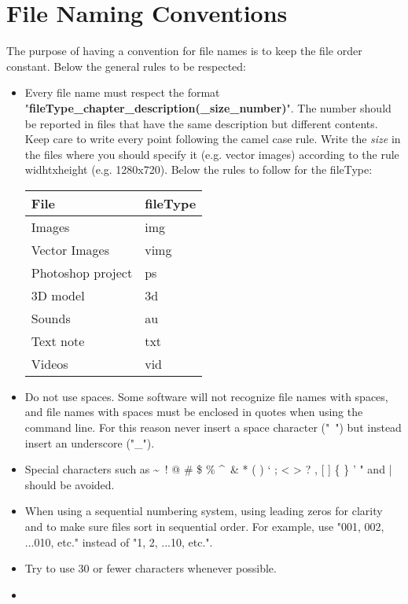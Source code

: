 \section{File Naming Conventions}
The purpose of having a convention for file names is to keep the file order constant. Below the general rules to be respected:
\begin{itemize}
	\item Every file name must respect the format "\textbf{fileType\_chapter\_description(\_size\_number)}". The number should be reported in files that have the same description but different contents. Keep care to write every point following the camel case rule. Write the \textit{size} in the files where you should specify it (e.g. vector images) according to the rule widhtxheight (e.g. 1280x720). Below the rules to follow for the fileType:
	
	\begin{center}
		\begin{tabular}[c]{| p{4cm} | p{4cm} |}
			\hline
			\textbf{File} & \textbf{fileType}\\
			\hline
			Images & img\\
			\hline
			Vector Images & vimg\\
			\hline
			Photoshop project & ps \\
			\hline
			3D model & 3d\\
			\hline
			Sounds & au\\
			\hline
			Text note & txt\\
			\hline
			Videos & vid\\
			\hline
		\end{tabular}
	\end{center}
	
	\item Do not use spaces. Some software will not recognize file names with spaces, and file names with spaces must be enclosed in quotes when using the command line. For this reason never insert a space character ("\ ") but instead insert an underscore ("\_").
	\item Special characters such as \textasciitilde\ ! @ \# \$ \% \textasciicircum\ \& * ( ) ` ; < > ? , [ ] \{ \} ' " and | should be avoided.
	\item When using a sequential numbering system, using leading zeros for clarity and to make sure files sort in sequential order. For example, use "001, 002, ...010, etc." instead of "1, 2, ...10, etc.".
	\item Try to use 30 or fewer characters whenever possible.
	\item 
\end{itemize}

